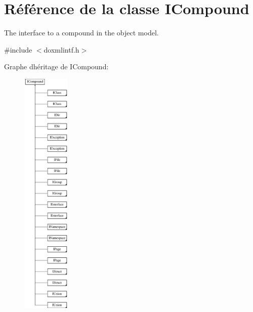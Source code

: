 \hypertarget{class_i_compound}{}\section{Référence de la classe I\+Compound}
\label{class_i_compound}


The interface to a compound in the object model.  




{\ttfamily \#include $<$doxmlintf.\+h$>$}

Graphe d\textquotesingle{}héritage de I\+Compound\+:\begin{figure}[H]
\begin{center}
\leavevmode
\includegraphics[height=12.000000cm]{class_i_compound}
\end{center}
\end{figure}

